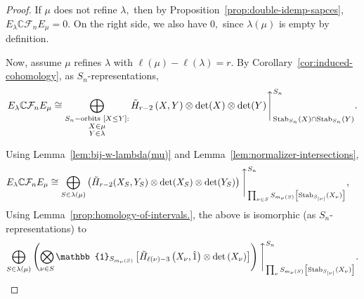\documentclass[ALCO, Unicode]{cedram}
\def\C{{\mathbb{C}}}
\def\stab{\mathrm{Stab}}
\begin{document}
\begin{proof}
If $\mu$ does not refine $\lambda,$ then  by Proposition~\ref{prop:double-idemp-sapces}, $E_\lambda \C \mathcal{F}_n E_\mu = 0.$ On the right side, we also have $0,$ since $\lambda(\mu)$ is empty by definition.

Now, assume  $\mu$ refines $\lambda$ with $\ell(\mu) - \ell(\lambda) = r.$
 By Corollary~\ref{cor:induced-cohomology}, as $S_n$-representations,
\[E_\lambda \C \mathcal{F}_n E_\mu \cong \bigoplus_{\substack{S_n-\text{orbits }[X \leq Y]:\\ X \in \mu\\ Y \in \lambda}} \Tilde{H}_{r - 2}\left(X, Y\right) \otimes \det(X) \otimes \det(Y)\Bigg \uparrow_{\stab_{S_n}(X) \cap \stab_{S_n}(Y)}^{S_n}.\]

Using Lemma~\ref{lem:bij-w-lambda(mu)} and Lemma~\ref{lem:normalizer-intersections},
    \begin{align*}
    E_\lambda \C \mathcal{F}_n E_\mu &\cong \bigoplus_{S \in \lambda(\mu)} \left(   \Tilde{H}_{r - 2}(X_S, Y_S) \otimes {\det(X_S) \otimes \det(Y_S)}\right)\Bigg\uparrow_{\prod_{\nu \in S}S_{m_\nu(S)}\left[\stab_{S_{|\nu|}}(X_\nu)\right]}^{S_n} ,
\end{align*}
 Using Lemma~\ref{prop:homology-of-intervals.}, the above is isomorphic (as $S_n$-representations) to
\begin{align} \label{eqn:before-fixing-S}
\bigoplus_{S \in \lambda(\mu)}\left(\bigotimes_{\nu \in S} \mathbb{1}_{S_{m_\nu(S)}}\left[ \Tilde{H}_{\ell(\nu) - 3} \left( X_\nu, \hat{1}\right) \otimes \det \left({X_{\nu}}\right)\right]\right)\Bigg \uparrow_{\prod_{\nu}S_{m_{\nu}(S)}\left[\stab_{S_{|\nu|}}(X_\nu)\right]}^{S_n}.
  \end{align}


\end{proof}
\end{document}
